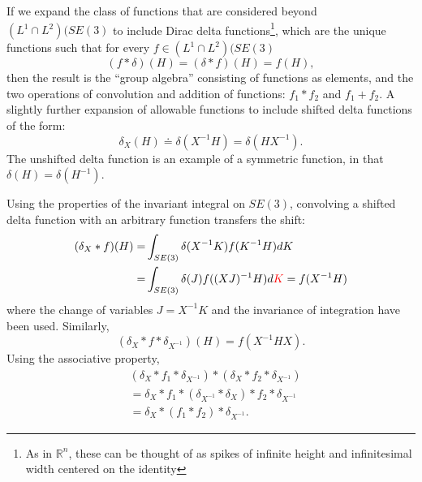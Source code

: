 \documentclass[twocolumn,10pt]{asme2ej}
\begin{document}
If we expand the class of functions that are considered beyond $(L^1 \cap L^2)(SE(3)$
to include Dirac delta functions\footnote{As in $\mathbb{R}^n$, these can be thought of as spikes
of infinite height and infinitesimal width centered on the identity}, which are the unique functions such that for every $f \in (L^1 \cap L^2)(SE(3)$
$$ (f * \delta)(H) = (\delta * f)(H) = f(H), $$
then the result is the ``group algebra'' consisting of functions as elements, and the two operations of convolution and addition of
functions: $f_1*f_2$ and $f_1 + f_2$. A slightly further expansion of allowable functions to include shifted delta functions of the form:
$$ \delta_X(H) \doteq \delta(X^{-1} H) = \delta( H X^{-1}). $$
The unshifted delta function is an example of a symmetric function, in that $\delta(H) = \delta(H^{-1})$.

Using the properties of the invariant integral on $SE(3)$, convolving a shifted delta function with an arbitrary
function transfers the shift:
\begin{equation}
\begin{split}
(\delta_X * f)(H) =& \int_{SE(3)} \delta(X^{-1} K) f(K^{-1} H) dK \\
=& \int_{SE(3)} \delta(J) f((XJ)^{-1} H) d{\color{red}K} = f(X^{-1} H) \\
\end{split}
\end{equation}
where the change of variables $J = X^{-1} K$ and the invariance of integration have been used.
Similarly,
$$ (\delta_X * f * \delta_{X^{-1}})(H) = f(X^{-1} H X). $$
Using the associative property,
\begin{equation}
\begin{split}
&(\delta_X * f_1 * \delta_{X^{-1}}) * (\delta_X * f_2 * \delta_{X^{-1}}) \\
&= \delta_X * f_1 * (\delta_{X^{-1}} * \delta_X) * f_2 * \delta_{X^{-1}} \\ 
&= \delta_X * (f_1 * f_2)* \delta_{X^{-1}}. 
\end{split}
\end{equation}
\end{document}
